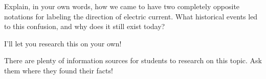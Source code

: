 

Explain, in your own words, how we came to have two completely opposite notations for labeling the direction of electric current.  What historical events led to this confusion, and why does it still exist today?







I'll let you research this on your own!







There are plenty of information sources for students to research on this topic.  Ask them where they found their facts!




